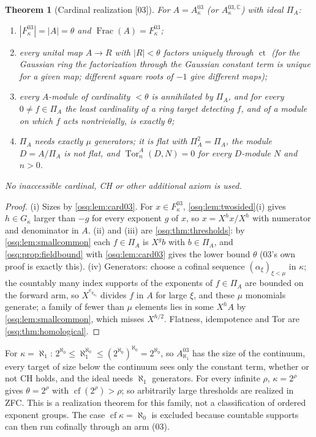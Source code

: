 \documentclass[11pt,letterpaper]{article}
\numberwithin{equation}{section}
\newtheorem{theorem}{Theorem}[section]
\theoremstyle{definition}
\theoremstyle{remark}
\theoremstyle{plain}
\newcommand{\C}{\mathbb C}
\newcommand{\ct}{\operatorname{ct}}
\newcommand{\Frac}{\operatorname{Frac}}
\newcommand{\Tor}{\operatorname{Tor}}
\newcommand{\cf}{\operatorname{cf}}
\newcommand{\src}[1]{\textup{\textsf{[#1]}}}
\begin{document}
\begin{theorem}[Cardinal realization \src{03}]\label{osq:thm:model03}
For $A=A^{03}_\kappa$ (or $A^{03,\C}_\kappa$) with ideal $\Pi_A$:
\begin{enumerate}
\item $|F^{03}_\kappa|=|A|=\theta$ and $\Frac(A)=F^{03}_\kappa$;
\item every unital map $A\to R$ with $|R|<\theta$ factors uniquely through $\ct$ (for the Gaussian
ring the factorization through the Gaussian constant term is unique for a given map; different
square roots of $-1$ give different maps);
\item every $A$-module of cardinality $<\theta$ is annihilated by $\Pi_A$, and for every
$0\ne f\in\Pi_A$ the least cardinality of a ring target detecting $f$, and of a module on which $f$
acts nontrivially, is exactly $\theta$;
\item $\Pi_A$ needs exactly $\mu$ generators; it is flat with $\Pi_A^2=\Pi_A$, the module $D=A/\Pi_A$
is not flat, and $\Tor^A_n(D,N)=0$ for every $D$-module $N$ and $n>0$.
\end{enumerate}
No inaccessible cardinal, CH or other additional axiom is used.
\end{theorem}
\begin{proof}
(i) Sizes by \cref{osq:lem:card03}. For $x\in F^{03}_\kappa$, \cref{osq:lem:twosided}(i) gives
$h\in G_\kappa$ larger than $-g$ for every exponent $g$ of $x$, so $x=X^hx/X^h$ with numerator and
denominator in $A$. (ii) and (iii) are \cref{osq:thm:thresholds}: by \cref{osq:lem:smallcommon} each
$f\in\Pi_A$ is $X^gb$ with $b\in\Pi_A$, and \cref{osq:prop:fieldbound} with \cref{osq:lem:card03}
gives the lower bound $\theta$ (03's own proof is exactly this). (iv) Generators: choose a cofinal
sequence $(\alpha_\xi)_{\xi<\mu}$ in $\kappa$; the countably many index supports of the exponents of
$f\in\Pi_A$ are bounded on the forward arm, so $X^{e_{q_{\alpha_\xi}}}$ divides $f$ in $A$ for large
$\xi$, and these $\mu$ monomials generate; a family of fewer than $\mu$ elements lies in some $X^hA$ by
\cref{osq:lem:smallcommon}, which misses $X^{h/2}$. Flatness, idempotence and Tor are
\cref{osq:thm:homological}.
\end{proof}

For $\kappa=\aleph_1$: $2^{\aleph_0}\le\aleph_1^{\aleph_0}\le(2^{\aleph_0})^{\aleph_0}=2^{\aleph_0}$,
so $A^{03}_{\aleph_1}$ has the size of the continuum, every target of size below the continuum sees only
the constant term, whether or not CH holds, and the ideal needs $\aleph_1$ generators. For every
infinite $\rho$, $\kappa=2^\rho$ gives $\theta=2^\rho$ with $\cf(2^\rho)>\rho$; so arbitrarily large
thresholds are realized in ZFC. This is a realization theorem for this family, not a classification
of ordered exponent groups. The case $\cf\kappa=\aleph_0$ is excluded because countable supports can
then run cofinally through an arm (03).
\end{document}
